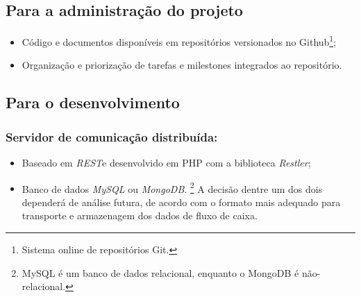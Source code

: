 \documentclass[a4paper]{abnt}
\begin{document}
\subsection{Para a administração do projeto}
\begin{itemize}
	\item Código e documentos disponíveis em repositórios versionados no Github\footnote{Sistema online de repositórios Git.};
	\item Organização e priorização de tarefas e milestones integrados ao repositório.
\end{itemize}
	
\subsection{Para o desenvolvimento}

\subsubsection{Servidor de comunicação distribuída:}
\begin{itemize}
	\item Baseado em \emph{REST}\footnotemark e desenvolvido em PHP com a biblioteca \emph{Restler}\footnotemark;
		
		\addtocounter{footnote}{-2}
		 
		 

	\item Banco de dados \emph{MySQL} ou \emph{MongoDB}.
		\footnote{MySQL é um banco de dados relacional, enquanto o MongoDB é não-relacional.} A decisão dentre um dos dois dependerá de análise futura, de acordo com o formato mais adequado para transporte e armazenagem dos dados de fluxo de caixa.
\end{itemize}
\end{document}
